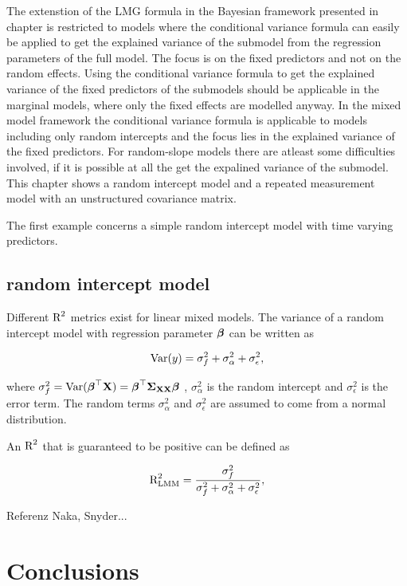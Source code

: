\documentclass[11pt,a4paper,twoside]{book}\usepackage[]{graphicx}\usepackage[]{color}
\begin{document}
The extenstion of the LMG formula in the Bayesian framework presented in chapter is restricted to models where the conditional variance formula can easily be applied to get the explained variance of the submodel from the regression parameters of the full model. The focus is on the fixed predictors and not on the random effects. Using the conditional variance formula to get the explained variance of the fixed predictors of the submodels should be applicable in the marginal models, where only the fixed effects are modelled anyway. In the mixed model framework the conditional variance formula is applicable to models including only random intercepts and the focus lies in the explained variance of the fixed predictors. For random-slope models there are atleast some difficulties involved, if it is possible at all the get the expalined variance of the submodel. This chapter shows a  random intercept model and a repeated measurement model with an unstructured covariance matrix.  

The first example concerns a simple random intercept model with time varying predictors.  

\section{random intercept model}

Different $\text{R}^2$ metrics exist for linear mixed models. The variance of a random intercept model with regression parameter ${\boldsymbol{\beta}}$ can be written as

      \begin{align} 
        \operatorname{Var}(y) = \sigma_{f}^2  + \sigma_{\alpha}^2 + \sigma_{\epsilon}^2, 
        \end{align}

where $\sigma_{f}^2 = \operatorname{Var}({\boldsymbol{\beta}}^\top {\mathbf{X}}) = {\boldsymbol{\beta}}^\top {\boldsymbol{\Sigma}}{}_{{\mathbf{X}} {\mathbf{X}}}  {\boldsymbol{\beta}}$ , $\sigma_{\alpha}^2 $ is the random intercept and $\sigma_{\epsilon}^2$ is the error term. The random terms $\sigma_{\alpha}^2 $ and $\sigma_{\epsilon}^2$ are assumed to come from a normal distribution.

An $\text{R}^2$ that is guaranteed to be positive can be defined as

   \begin{align} 
\text{R}^2_{\text{LMM}} = \frac{\sigma_{f}^2}{\sigma_{f}^2 + \sigma_{\alpha}^2 + \sigma_{\epsilon}^2},
\end{align}

Referenz Naka, Snyder...














\chapter{Conclusions}


\cleardoublepage
{}
{}


 


\cleardoublepage
\end{document}
